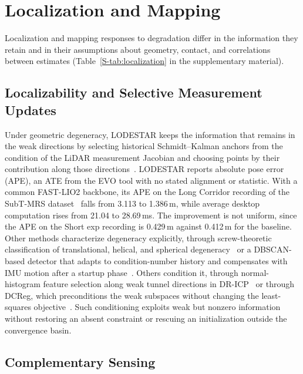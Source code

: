 \section{Localization and Mapping}
\label{sec:localization}

Localization and mapping responses to degradation differ in the information they retain and in their assumptions about geometry, contact, and correlations between estimates (Table~\ref{S-tab:localization} in the supplementary material).

\subsection{Localizability and Selective Measurement Updates}

Under geometric degeneracy, LODESTAR keeps the information that remains in the weak directions by selecting historical Schmidt--Kalman anchors from the condition of the LiDAR measurement Jacobian and choosing points by their contribution along those directions~\cite{P_E01}. LODESTAR reports absolute pose error (APE), an ATE from the EVO tool with no stated alignment or statistic. With a common FAST-LIO2 backbone, its APE on the Long Corridor recording of the SubT-MRS dataset~\cite{P_K01} falls from 3.113 to 1.386\,m, while average desktop computation rises from 21.04 to 28.69\,ms. The improvement is not uniform, since the APE on the Short exp recording is 0.429\,m against 0.412\,m for the baseline. Other methods characterize degeneracy explicitly, through screw-theoretic classification of translational, helical, and spherical degeneracy~\cite{P_E05} or a DBSCAN-based detector that adapts to condition-number history and compensates with IMU motion after a startup phase~\cite{P_S31}. Others condition it, through normal-histogram feature selection along weak tunnel directions in DR-ICP~\cite{P_S24} or through DCReg, which preconditions the weak subspaces without changing the least-squares objective~\cite{P_S37}. Such conditioning exploits weak but nonzero information without restoring an absent constraint or rescuing an initialization outside the convergence basin.

\subsection{Complementary Sensing}

